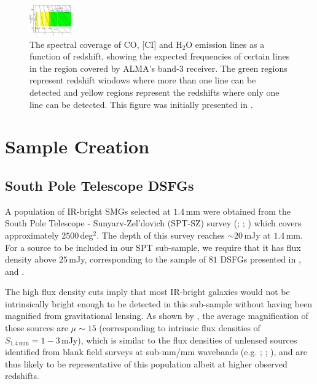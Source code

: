 \begin{figure}
	\centering
	\includegraphics[width=0.75\columnwidth]{Figures/redshift_ladder.pdf}
	\caption[Spectral coverage of molecular emission lines]{The spectral coverage of CO, [CI] and H$_2$O emission lines as a function of redshift, showing the expected frequencies of certain lines in the region covered by ALMA's band-3 receiver. The green regions represent redshift windows where more than one line can be detected and yellow regions represent the redshifts where only one line can be detected. This figure was initially presented in \citealt{Weiss_2013}.}
	\label{fig:redshift_ladder}
\end{figure}

\section{Sample Creation}

\subsection{South Pole Telescope DSFGs}

A population of IR-bright SMGs selected at $1.4\,$mm were obtained from the South Pole Telescope - Sunyarv-Zel'dovich (SPT-SZ) survey (\citealt{Vieira_2010}; \citealt{Mocanu_2013}; \citealt{Everett_2020}) which covers approximately $2500\,$deg$^2$. The depth of this survey reaches $\sim 20\,$mJy at $1.4\,$mm. For a source to be included in our SPT sub-sample, we require that it has flux density above $25\,$mJy, corresponding to the sample of $81$ DSFGs presented in \citealt{Weiss_2013}, \citealt{Strandet_2016} and \citealt{Reuter_2020}.

The high flux density cuts imply that most IR-bright galaxies would not be intrinsically bright enough to be detected in this sub-sample without having been magnified from gravitational lensing. As shown by \citealt{Weiss_2013}, the average magnification of these sources are $\mu \sim 15$ (corresponding to intrinsic flux densities of $S_{1.4\,\textrm{mm}} = 1 - 3\,$mJy), which is similar to the flux densities of unlensed sources identified from blank field surveys at sub-mm/mm wavebands (e.g. \citealt{Coppin_2006}; \citealt{Pope_2006}; \citealt{Weiss_2009}), and are thus likely to be representative of this population albeit at higher observed redshifts.

